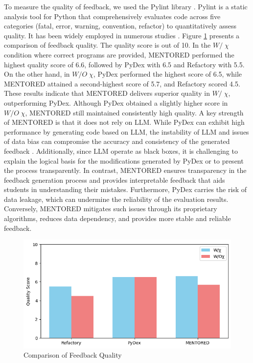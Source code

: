 \documentclass[10pt,conference]{IEEEtran}
\begin{document}
        To measure the quality of feedback, we used the Pylint library \cite{pylintPylintCode}. Pylint is a static analysis tool for Python that comprehensively evaluates code across five categories (fatal, error, warning, convention, refactor) to quantitatively assess quality. It has been widely employed in numerous studies \cite{siddiq2024quality, horschig2018java, apostolidis2023evaluation, agarwal2020quality}. Figure \ref{fig:quality} presents a comparison of feedback quality. The quality score is out of 10. In the $W/\;\chi$ condition where correct programs are provided, MENTORED performed the highest quality score of 6.6, followed by PyDex with 6.5 and Refactory with 5.5. On the other hand, in $W/O\;\chi$, PyDex performed the highest score of 6.5, while MENTORED attained a second-highest score of 5.7, and Refactory scored 4.5. These results indicate that MENTORED delivers superior quality in $W/\;\chi$, outperforming PyDex. Although PyDex obtained a slightly higher score in $W/O\;\chi$, MENTORED still maintained consistently high quality. A key strength of MENTORED is that it does not rely on LLM. While PyDex can exhibit high performance by generating code based on LLM, the instability of LLM and issues of data bias can compromise the accuracy and consistency of the generated feedback \cite{zhang2024pydex}. Additionally, since LLM operate as black boxes, it is challenging to explain the logical basis for the modifications generated by PyDex or to present the process transparently. In contrast, MENTORED ensures transparency in the feedback generation process and provides interpretable feedback that aids students in understanding their mistakes. Furthermore, PyDex carries the risk of data leakage, which can undermine the reliability of the evaluation results. Conversely, MENTORED mitigates such issues through its proprietary algorithms, reduces data dependency, and provides more stable and reliable feedback.
        
        \begin{figure}[h]
            \centering
            \includegraphics[width=1.0\linewidth]{quality.png}
            \caption{Comparison of Feedback Quality}
            \label{fig:quality}
        \end{figure}
\end{document}
